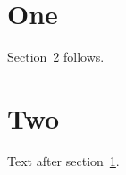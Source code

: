 \documentclass{article}
\begin{document}
\tableofcontents
\section{One}\label{sec:one}
Section~\ref{sec:two} follows.
\section{Two}\label{sec:two}
Text after section~\ref{sec:one}.
\end{document}
